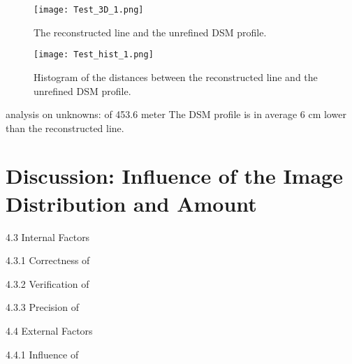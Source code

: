 \begin{figure} [h!]
  \centering
  \texttt{[image: Test\_3D\_1.png]} %
  \caption{\small The reconstructed line and the unrefined DSM profile.}
  \label{fig:Test3D_1}
  \vspace{1cm}
  \texttt{[image: Test\_hist\_1.png]} %
  \caption{\small Histogram of the distances between the reconstructed line and the unrefined DSM profile.}
  \label{fig:TestHist_1}
\end{figure}

analysis on unknowns:
of 453.6 meter
The DSM profile is in average 6 cm lower than the reconstructed line. 






\section{Discussion: Influence of the Image Distribution and Amount}
\label{sec:discussion-ImageDistributionAmount}





4.3 Internal Factors

4.3.1 Correctness of

4.3.2 Verification of

4.3.3 Precision of


4.4 External Factors

4.4.1 Influence of 

